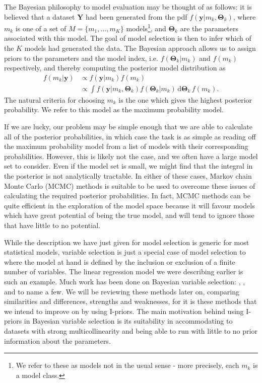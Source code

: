 The Bayesian philosophy to model evaluation may be thought of as follows: it is believed that a dataset $\mathbf Y$ had been generated from the pdf $f(\mathbf y|m_k, \boldsymbol\Theta_k)$, where $m_k$ is one of a set of $M=\{m_1, \dots, m_K\}$ models\footnote{We refer to these as models not in the usual sense - more precisely, each $m_k$ is a model class.}, and $\boldsymbol\Theta_k$ are the parameters associated with this model. The goal of model selection is then to infer which of the $K$ models had generated the data. The Bayesian approach allows us to assign priors to the parameters and the model index, i.e. $f(\boldsymbol\Theta_k|m_k)$ and $f(m_k)$ respectively, and thereby computing the posterior model distribution as
\begin{align*}
	f(m_k|\mathbf y)	&\propto f(\mathbf y|m_k)f(m_k) \\
						&\propto \int f(\mathbf y|m_k, \boldsymbol\Theta_k)
							f(\boldsymbol\Theta_k|m_k) \, \text{d}\boldsymbol\Theta_k \, f(m_k).
\end{align*}
The natural criteria for choosing $m_k$ is the one which gives the highest posterior probability. We refer to this model as the maximum probability model. 

If we are lucky, our problem may be simple enough that we are able to calculate all of the posterior probabilities, in which case the task is as simple as reading off the maximum probability model from a list of models with their corresponding probabilities. However, this is likely not the case, and we often have a large model set to consider. Even if the model set is small, we might find that the integral in the posterior is not analytically tractable. In either of these cases, Markov chain Monte Carlo (MCMC) methods is suitable to be used to overcome these issues of calculating the required posterior probabilities. In fact, MCMC methods can be quite efficient in the exploration of the model space because it  will favour models which have great potential of being the true model, and will tend to ignore those that have little to no potential. 

While the description we have just given for model selection is generic for most statistical models, variable selection is just a special case of model selection to where the model at hand is defined by the inclusion or exclusion of a finite number of variables. The linear regression model we were describing earlier is such an example. Much work has been done on Bayesian variable selection: \cite{George1993}, \cite{Kuo1998}, and \cite{Dellaportas2002} to name a few. We will be reviewing these methods later on, comparing similarities and differences, strengths and weaknesses, for it is these methods that we intend to improve on by using I-priors. The main motivation behind using I-priors in Bayesian variable selection is its suitability in accommodating to datasets with strong multicollinearity and being able to run with little to no prior information about the parameters.

